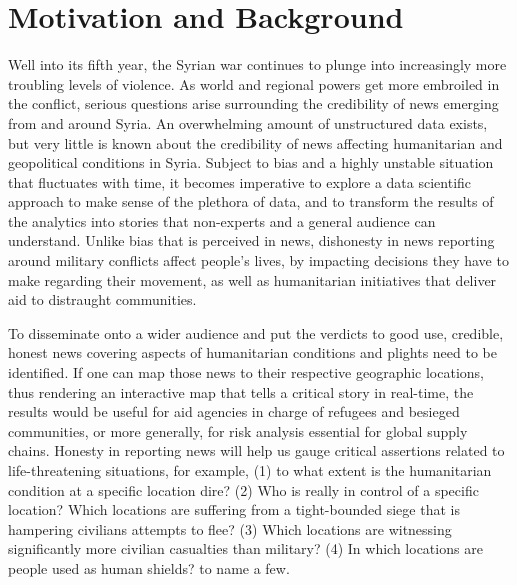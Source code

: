 \section{Motivation and Background}

Well into its fifth year, the Syrian war continues to plunge into increasingly more troubling levels of violence. As world and regional powers get more embroiled in the conflict, serious questions arise surrounding the credibility of news emerging from and around Syria. An overwhelming amount of unstructured data exists, but very little is known about the credibility of news affecting humanitarian and geopolitical conditions in Syria. Subject to bias and a highly unstable situation that fluctuates with time, it becomes imperative to explore a data scientific approach to make sense of the plethora of data, and to transform the results of the analytics into stories that non-experts and a general audience can understand. Unlike bias that is perceived in news, dishonesty in news reporting around military conflicts affect people's lives, by impacting decisions they have to make regarding their movement, as well as humanitarian initiatives that deliver aid to distraught communities. 

To disseminate onto a wider audience and put the verdicts to good use, credible, honest news covering aspects of humanitarian conditions and plights need to be identified. If one can map those news to their respective geographic locations, thus rendering an interactive map that tells a critical story in real-time, the results would be useful for aid agencies in charge of refugees and besieged communities, or more generally, for risk analysis essential for global supply chains. Honesty in reporting news will help us gauge critical assertions related to life-threatening situations, for example, (1) to what extent is the humanitarian condition at a specific location dire? (2) Who is really in control of a specific location? Which locations are suffering from a tight-bounded siege that is hampering civilians attempts to flee? (3) Which locations are witnessing significantly more civilian casualties than military? (4) In which locations are people used as human shields? to name a few. 


